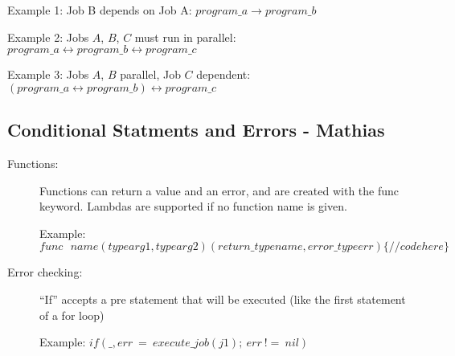 Example 1: Job B depends on Job A: $program\_a \rightarrow program\_b$

Example 2: Jobs $A$, $B$, $C$ must run in parallel: $program\_a 
\leftrightarrow program\_b \leftrightarrow program\_c$

Example 3:
Jobs $A$, $B$ parallel, Job $C$ dependent:
$(program\_a \leftrightarrow program\_b ) \leftrightarrow program\_c$

\subsection{Conditional Statments and Errors - Mathias}
\begin{description}
\item [Functions:] Functions can return a value and an error, 
and are created with the func keyword. Lambdas are supported if no function name is given.

Example:
$func~~~name(type arg1, type arg2)(return\_type name, error\_type err)\{ //code here\}$ 
%

\item [Error checking:] ``If'' accepts a pre statement that will be executed (like the first 
statement of a for loop)

Example:
$if (\_, err~=~execute\_job(j1);~ err~ !=~ nil) {}$
\end{description}


%
%
%
%
